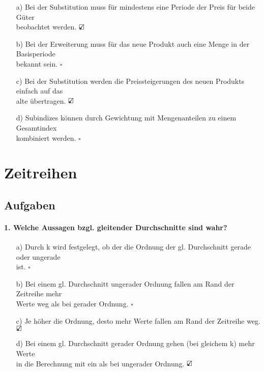 \documentclass[a4paper]{article}
\begin{document}
\begin{itemize}
    \item[a)] Bei der Substitution muss für mindestens eine Periode der Preis für beide Güter\\beobachtet werden. \hfill $\text{\rlap{$\checkmark$}}\square$
    \item[b)] Bei der Erweiterung muss für das neue Produkt auch eine Menge in der Basisperiode\\bekannt sein. \hfill $\square$
    \item[c)] Bei der Substitution werden die Preissteigerungen des neuen Produkts einfach auf das\\alte übertragen. \hfill $\text{\rlap{$\checkmark$}}\square$
    \item[d)] Subindizes können durch Gewichtung mit Mengenanteilen zu einem Gesamtindex\\kombiniert werden. \hfill $\square$
\end{itemize}


\clearpage


\section{Zeitreihen}

\subsection{Aufgaben}

\paragraph{1. Welche Aussagen bzgl. gleitender Durchschnitte sind wahr?}

\begin{itemize}
    \item[a)] Durch k wird festgelegt, ob der die Ordnung der gl. Durchschnitt gerade oder ungerade\\ist. \hfill $\square$
    \item[b)] Bei einem gl. Durchschnitt ungerader Ordnung fallen am Rand der Zeitreihe mehr\\Werte weg als bei gerader Ordnung. \hfill $\square$
    \item[c)] Je höher die Ordnung, desto mehr Werte fallen am Rand der Zeitreihe weg. \hfill $\text{\rlap{$\checkmark$}}\square$
    \item[d)] Bei einem gl. Durchschnitt gerader Ordnung gehen (bei gleichem k) mehr Werte\\in die Berechnung mit ein als bei ungerader Ordnung. \hfill $\text{\rlap{$\checkmark$}}\square$
\end{itemize}
\end{document}
